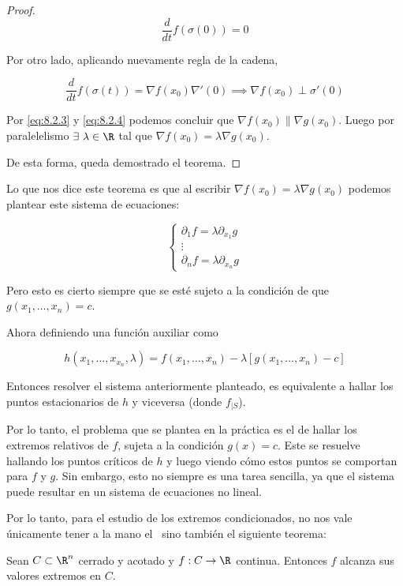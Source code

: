 \begin{proof}
    \[
    \frac{d}{dt} f(\sigma(0)) = 0
    \]
    
    Por otro lado, aplicando nuevamente regla de la cadena,
    
    \begin{equation}\label{eq:8.2.4}
        \frac{d}{dt} f(\sigma(t)) = \nabla f(x_0) \nabla'(0) \implies \nabla f(x_0) \perp \sigma'(0)
    \end{equation}
    
    Por \ref{eq:8.2.3} y \ref{eq:8.2.4} podemos concluir que $\nabla f(x_0) \parallel \nabla g(x_0)$. Luego por paralelelismo $\exists~\lambda \in \R$ tal que $\nabla f(x_0) = \lambda \nabla g(x_0)$.
    
    De esta forma, queda demostrado el teorema.
\end{proof}

Lo que nos dice este teorema es que al escribir $\nabla f(x_0) = \lambda \nabla g(x_0)$ podemos plantear este sistema de ecuaciones:

\[
\begin{cases}
    \partial_1 f = \lambda \partial_{x_1}g \\
    \vdots                                 \\
    \partial_n f = \lambda \partial_{x_n}g
\end{cases}
\]

Pero esto es cierto siempre que se esté sujeto a la condición de que $g(x_1, \dots, x_n) = c$.

Ahora definiendo una función auxiliar como

\[
h(x_1, \dots, x_{x_n}, \lambda) = f(x_1, \dots, x_n) - \lambda\left[g(x_1, \dots, x_n) - c\right]
\]

Entonces resolver el sistema anteriormente planteado, es equivalente a hallar los puntos estacionarios de $h$ y viceversa (donde $f_{|S}$).

Por lo tanto, el problema que se plantea en la práctica es el de hallar los extremos relativos de $f$, sujeta a la condición $g(x) = c$. Este se resuelve hallando los puntos críticos de $h$ y luego viendo cómo estos puntos se comportan para $f$ y $g$. Sin embargo, esto no siempre es una tarea sencilla, ya que el sistema puede resultar en un sistema de ecuaciones no lineal.

Por lo tanto, para el estudio de los extremos condicionados, no nos vale únicamente tener a la mano el \Lagrange~sino también el siguiente teorema:

\begin{teo}\label{teo:max-min}
    Sean $C \subset \R^n$ cerrado y acotado y $f: C \rightarrow \R$ continua. Entonces $f$ alcanza sus valores extremos en $C$.
\end{teo}

